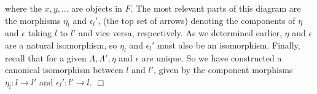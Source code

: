 \documentclass[main.tex]{subfiles}
\begin{document}

\noindent where the $ x, y, ... $ are objects in $ F $. The most relevant parts of this diagram are the morphisms $ \eta_l $ and $ \epsilon_l' $, (the top set of arrows) denoting the components of $ \eta $ and $ \epsilon $ taking $ l $ to $ l' $ and vice versa, respectively. As we determined earlier, $ \eta $ and $ \epsilon $ are a natural isomorphism, so $ \eta_l $ and $ \epsilon_l' $ must also be an isomorphism. Finally, recall that for a given $ \Lambda, \Lambda'; \eta $ and $ \epsilon $ are unique. So we have constructed a canonical isomorphism between $ l $ and $ l' $, given by the component morphisms $ \eta_l: l \to l' $ and $ \epsilon_l': l' \to l. $ $ \Box $
\end{document}
